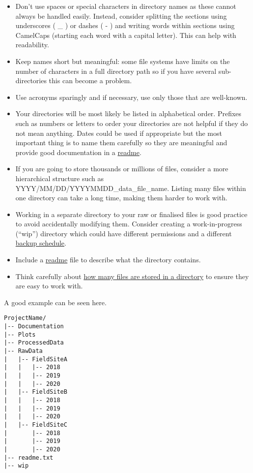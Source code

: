 \documentclass[a4paper,oneside]{report}
\providecommand{\tightlist}{%
  \setlength{\itemsep}{0pt}\setlength{\parskip}{0pt}}
\begin{document}
\begin{itemize}
\tightlist
\item
  Don't use spaces or special characters in directory names as these
  cannot always be handled easily. Instead, consider splitting the
  sections using underscores ( \_ ) or dashes ( - ) and writing words
  within sections using CamelCaps (starting each word with a capital
  letter). This can help with readability.
\item
  Keep names short but meaningful: some file systems have limits on the
  number of characters in a full directory path so if you have several
  sub-directories this can become a problem.
\item
  Use acronyms sparingly and if necessary, use only those that are
  well-known.
\item
  Your directories will be most likely be listed in alphabetical order.
  Prefixes such as numbers or letters to order your directories are not
  helpful if they do not mean anything. Dates could be used if
  appropriate but the most important thing is to name them carefully so
  they are meaningful and provide good documentation in a
  \protect\hyperlink{readmetxt}{readme}.
\item
  If you are going to store thousands or millions of files, consider a
  more hierarchical structure such as
  YYYY/MM/DD/YYYYMMDD\_data\_file\_name. Listing many files within one
  directory can take a long time, making them harder to work with.
\item
  Working in a separate directory to your raw or finalised files is good
  practice to avoid accidentally modifying them. Consider creating a
  work-in-progress (``wip'') directory which could have different
  permissions and a different \protect\hyperlink{data-backing}{backup
  schedule}.
\item
  Include a \protect\hyperlink{readmetxt}{readme} file to describe what
  the directory contains.
\item
  Think carefully about
  \protect\hyperlink{number-of-files-in-a-directory}{how many files are
  stored in a directory} to ensure they are easy to work with.
\end{itemize}

A good example can be seen here.

\begin{verbatim}
ProjectName/
|-- Documentation
|-- Plots
|-- ProcessedData
|-- RawData
|   |-- FieldSiteA
|   |   |-- 2018
|   |   |-- 2019
|   |   |-- 2020
|   |-- FieldSiteB
|   |   |-- 2018
|   |   |-- 2019
|   |   |-- 2020
|   |-- FieldSiteC
|       |-- 2018
|       |-- 2019
|       |-- 2020
|-- readme.txt
|-- wip
\end{verbatim}
\end{document}
